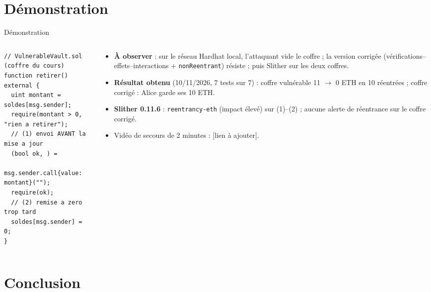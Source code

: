 \documentclass[11pt,aspectratio=169]{beamer}
\begin{document}
\section{Démonstration}

\begin{frame}[fragile]{Démonstration}
  \begin{columns}[c]
    \begin{column}{0.47\textwidth}
\begin{lstlisting}
// VulnerableVault.sol (coffre du cours)
function retirer() external {
  uint montant = soldes[msg.sender];
  require(montant > 0, "rien a retirer");
  // (1) envoi AVANT la mise a jour
  (bool ok, ) =
      msg.sender.call{value: montant}("");
  require(ok);
  // (2) remise a zero trop tard
  soldes[msg.sender] = 0;
}
\end{lstlisting}
    \end{column}
    \begin{column}{0.51\textwidth}
      \footnotesize
      \begin{itemize}
        \item \textbf{À observer} : sur le réseau Hardhat local, l'attaquant vide le coffre ; la version corrigée (vérifications--effets--interactions + \texttt{nonReentrant}) résiste ; puis Slither sur les deux coffres.
        \item \textbf{Résultat obtenu} (10/11/2026, 7 tests sur 7) : coffre vulnérable 11 $\to$ 0 ETH en 10 réentrées ; coffre corrigé : Alice garde ses 10 ETH.
        \item \textbf{Slither 0.11.6} : \texttt{reentrancy-eth} (impact élevé) sur (1)--(2) ; aucune alerte de réentrance sur le coffre corrigé.
        \item Vidéo de secours de 2 minutes : [lien à ajouter].
      \end{itemize}
    \end{column}
  \end{columns}
\end{frame}

\section{Conclusion}
\end{document}
